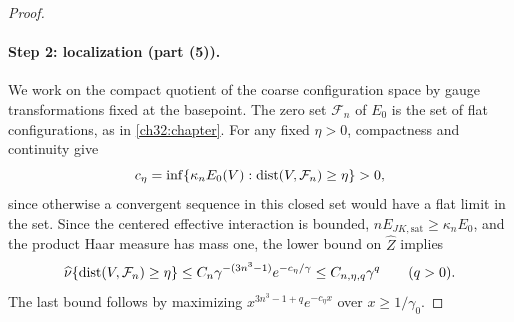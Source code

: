 \begin{proof}
\paragraph{Step 2: localization (part (5)).}
We work on the compact quotient of the coarse configuration space by gauge transformations fixed at the basepoint. The zero set $\mathcal F_n$ of $E_0$ is the set of flat configurations, as in \cref{ch32:chapter}. For any fixed $\eta>0$, compactness and continuity give
\[
 c_\eta=\inf\{\kappa_nE_0(V):\operatorname{dist}(V,\mathcal F_n)\ge\eta\}>0,
\]
since otherwise a convergent sequence in this closed set would have a flat limit in the set. Since the centered effective interaction is bounded, $nE_{JK,\mathrm{sat}}\ge\kappa_nE_0$, and the product Haar measure has mass one, the lower bound on $\widehat Z$ implies
\begin{equation}\label{ch31:eq:nonflat-gap}
 \widehat\nu\{\operatorname{dist}(V,\mathcal F_n)\ge\eta\}\le C_n\gamma^{-(3n^3-1)}e^{-c_\eta/\gamma}\le C_{n,\eta,q}\gamma^q\qquad(q>0).
\end{equation}
The last bound follows by maximizing $x^{3n^3-1+q}e^{-c_\eta x}$ over $x\ge1/\gamma_0$.


\end{proof}
